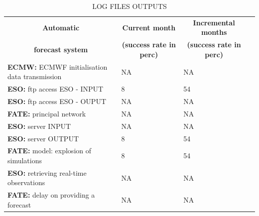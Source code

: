 \documentclass[a4paper,english]{article}
\newcommand{\HRule}{\rule{\linewidth}{0.5mm}}
\begin{document}
\clearpage
\begin{table}[]
\begin{center}
\begin{tabular}{|l|l|l|l|}
\hline
\multicolumn{1}{|c|}{\cellcolor[HTML]{C0C0C0}\textbf{Automatic}} & \multicolumn{1}{c|}{\cellcolor[HTML]{C0C0C0}\textbf{Current month}} & \multicolumn{1}{c|}{\cellcolor[HTML]{C0C0C0}\textbf{Incremental months}} \\
\multicolumn{1}{|c|}{\cellcolor[HTML]{C0C0C0}\textbf{forecast system}} & \multicolumn{1}{c|}{\cellcolor[HTML]{C0C0C0}\textbf{(success rate in perc)}} & \multicolumn{1}{c|}{\cellcolor[HTML]{C0C0C0}\textbf{(success rate in perc)}} \\
\hline
\cellcolor[HTML]{C0C0C0}\textbf{ECMW:} ECMWF initialisation data transmission  & NA           & NA    \\
\cellcolor[HTML]{C0C0C0}\textbf{ESO:} ftp access ESO - INPUT                   & 8           & 54   \\
\cellcolor[HTML]{C0C0C0}\textbf{ESO:} ftp access ESO - OUPUT                   & NA           & NA   \\
\cellcolor[HTML]{C0C0C0}\textbf{FATE:} principal network                       & NA           & NA   \\
\cellcolor[HTML]{C0C0C0}\textbf{ESO:} server INPUT                             & NA           & NA   \\
\cellcolor[HTML]{C0C0C0}\textbf{ESO:} server OUTPUT                            & 8           & 54   \\
\cellcolor[HTML]{C0C0C0}\textbf{FATE:} model: explosion of simulations         & 8           & 54   \\
\cellcolor[HTML]{C0C0C0}\textbf{ESO:} retrieving real-time observations        & NA           & NA   \\
\cellcolor[HTML]{C0C0C0}\textbf{FATE:} delay on providing a forecast           & NA           & NA   \\
\hline
\end{tabular}
\caption{LOG FILES OUTPUTS}
\end{center}
\end{table}

\clearpage
\end{document}
